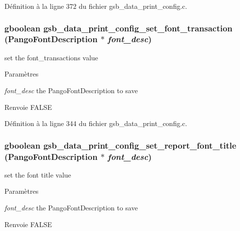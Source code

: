 Définition à la ligne 372 du fichier gsb\_\-data\_\-print\_\-config.c.

\subsubsection[{gsb\_\-data\_\-print\_\-config\_\-set\_\-font\_\-transaction}]{\setlength{\rightskip}{0pt plus 5cm}gboolean gsb\_\-data\_\-print\_\-config\_\-set\_\-font\_\-transaction (PangoFontDescription $\ast$ {\em font\_\-desc})}\label{gsb__data__print__config_8h_ab1a5ac2e69698c3aa4cd3cff44344538}
set the font\_\-transactions value


\begin{DoxyParams}{Paramètres}
\item[{\em font\_\-desc}]the PangoFontDescription to save\end{DoxyParams}
\begin{DoxyReturn}{Renvoie}
FALSE 
\end{DoxyReturn}


Définition à la ligne 344 du fichier gsb\_\-data\_\-print\_\-config.c.

\subsubsection[{gsb\_\-data\_\-print\_\-config\_\-set\_\-report\_\-font\_\-title}]{\setlength{\rightskip}{0pt plus 5cm}gboolean gsb\_\-data\_\-print\_\-config\_\-set\_\-report\_\-font\_\-title (PangoFontDescription $\ast$ {\em font\_\-desc})}\label{gsb__data__print__config_8h_a57d1c4cbe472fd57f2c4312ab9d23520}
set the font title value


\begin{DoxyParams}{Paramètres}
\item[{\em font\_\-desc}]the PangoFontDescription to save\end{DoxyParams}
\begin{DoxyReturn}{Renvoie}
FALSE 
\end{DoxyReturn}


